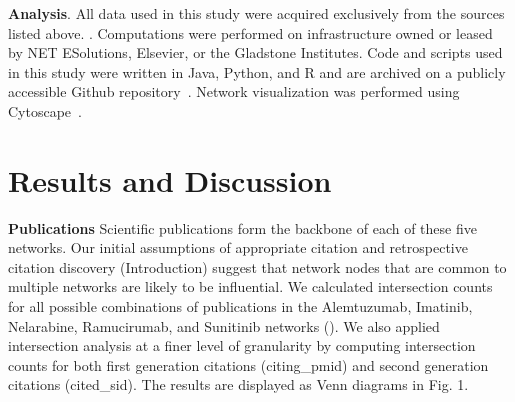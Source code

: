 \documentclass[10pt,letterpaper]{article}
\begin{document}
\textbf{Analysis}. All data used in this study were acquired exclusively from the sources listed above. . Computations were performed on infrastructure owned or leased by NET ESolutions, Elsevier, or the Gladstone Institutes. Code and scripts used in this study were written in Java, Python, and R and are archived on a publicly accessible Github repository~\cite{bibGithub}.  Network visualization was performed using Cytoscape~\cite{bibCytoscape}.

\section*{Results and Discussion} 
\textbf{Publications} Scientific publications form the backbone of each of these five networks. Our initial assumptions of appropriate citation and retrospective citation discovery (Introduction) suggest that network nodes that are common to multiple networks are likely to be influential. We calculated intersection counts for all possible combinations of publications in the Alemtuzumab, Imatinib, Nelarabine, Ramucirumab, and Sunitinib networks (). We also applied intersection analysis at a finer level of granularity by computing intersection counts for both first generation citations (citing\_pmid) and second generation citations (cited\_sid). The results are displayed as Venn diagrams in Fig. 1. 
\end{document}
